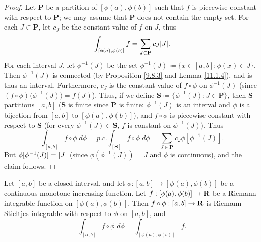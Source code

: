 \begin{proof}
    Let \(\mathbf{P}\) be a partition of \([\phi(a), \phi(b)]\) such that \(f\) is piecewise constant with respect to \(\mathbf{P}\);
    we may assume that \(\mathbf{P}\) does not contain the empty set.
    For each \(J \in \mathbf{P}\), let \(c_J\) be the constant value of \(f\) on \(J\), thus
    \[
        \int_{[\phi(a), \phi(b)]} f = \sum_{J \in \mathbf{P}} c_J \abs{J}.
    \]
    For each interval \(J\), let \(\phi^{-1}(J)\) be the set \(\phi^{-1}(J) \coloneqq \{x \in [a, b] : \phi(x) \in J\}\).
    Then \(\phi^{-1}(J)\) is connected (by Proposition \ref{9.8.3} and Lemma \ref{11.1.4}), and is thus an interval.
    Furthermore, \(c_J\) is the constant value of \(f \circ \phi\) on \(\phi^{-1}(J)\) (since \((f \circ \phi)\big(\phi^{-1}(J)\big) = f(J)\)).
    Thus, if we define \(\mathbf{S} \coloneqq \{\phi^{-1} (J) : J \in \mathbf{P}\}\), then \(\mathbf{S}\) partitions \([a, b]\)
    (\(\mathbf{S}\) is finite since \(\mathbf{P}\) is finite;
    \(\phi^{-1}(J)\) is an interval and \(\phi\) is a bijection from \([a, b]\) to \([\phi(a), \phi(b)]\)),
    and \(f \circ \phi\) is piecewise constant with respect to \(\mathbf{S}\) (for every \(\phi^{-1}(J) \in \mathbf{S}\), \(f\) is constant on \(\phi^{-1}(J)\)).
    Thus
    \[
        \int_{[a, b]} f \circ \phi \; d \phi = p.c. \int_{[\mathbf{S}]} f \circ \phi \; d \phi = \sum_{J \in \mathbf{P}} c_J \phi[\phi^{-1}(J)].
    \]
    But \(\phi[\phi^{-1}(J)] = \left\lvert J\right\rvert\) (since \(\phi(\phi^{-1}(J)) = J\) and \(\phi\) is continuous), and the claim follows.
\end{proof}

\begin{proposition}\label{11.10.6}
    Let \([a, b]\) be a closed interval, and let \(\phi : [a, b] \to [\phi(a), \phi(b)]\) be a continuous monotone increasing function.
    Let \(f : [\phi(a), \phi(b)] \to \mathbf{R}\) be a Riemann integrable function on \([\phi(a), \phi(b)]\).
    Then \(f \circ \phi : [a, b] \to \mathbf{R}\) is Riemann-Stieltjes integrable with respect to \(\phi\) on \([a, b]\), and
    \[
        \int_{[a, b]} f \circ \phi \; d \phi = \int_{[\phi(a), \phi(b)]} f.
    \]
\end{proposition}

